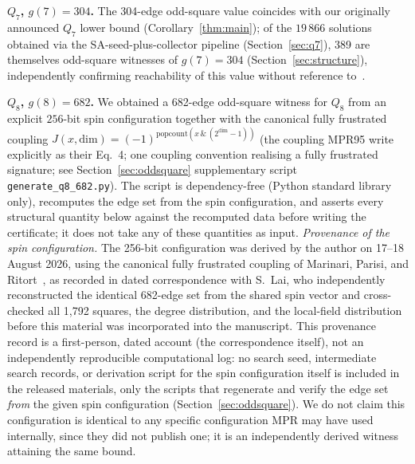 \documentclass[12pt]{article}
\begin{document}
\textbf{$Q_7$, $g(7)=304$.} The 304-edge odd-square value coincides with our
originally announced $Q_7$ lower bound (Corollary~\ref{thm:main}); of the
$19\,866$ solutions obtained via the SA-seed-plus-collector pipeline (Section~\ref{sec:q7}),
389 are themselves odd-square witnesses of $g(7)=304$
(Section~\ref{sec:structure}), independently confirming reachability of this
value without reference to~\cite{DPTV79}.

\textbf{$Q_8$, $g(8)=682$.} We obtained a 682-edge odd-square witness
for $Q_8$ from an explicit $256$-bit spin configuration together with the
canonical fully frustrated coupling
$J(x,\mathrm{dim})=(-1)^{\mathrm{popcount}(x\,\&\,(2^{\mathrm{dim}}-1))}$
(the coupling MPR95 write explicitly as their Eq.~4;
one coupling convention realising a fully frustrated signature; see
Section~\ref{sec:oddsquare} supplementary script \texttt{generate\_q8\_682.py}).
The script is dependency-free (Python standard library only),
recomputes the edge set from the spin configuration, and asserts every
structural quantity below against the recomputed data before writing the
certificate; it does not take any of these quantities as input.
\emph{Provenance of the spin configuration.} The 256-bit configuration
was derived by the author on 17--18 August 2026, using the canonical
fully frustrated coupling of Marinari, Parisi, and Ritort~\cite{MPR95},
as recorded in dated correspondence with S.~Lai, who independently
reconstructed the identical 682-edge set from the shared spin vector and
cross-checked all 1,792 squares, the degree distribution, and the
local-field distribution before this material was incorporated into the
manuscript. This provenance record is a first-person, dated account
(the correspondence itself), not an independently reproducible
computational log: no search seed, intermediate search records, or
derivation script for the spin configuration itself is included in the
released materials, only the scripts that regenerate and verify the
edge set \emph{from} the given spin configuration
(Section~\ref{sec:oddsquare}). We do not claim this configuration is
identical to any specific configuration MPR may have used internally,
since they did not publish one; it is an independently derived witness
attaining the same bound.
\end{document}
